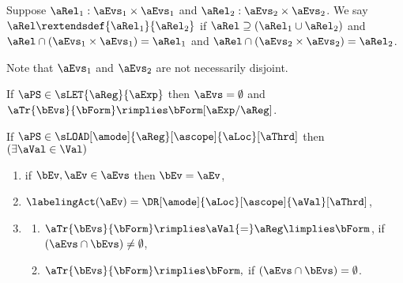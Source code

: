 \begin{definition}
  Suppose $\aRel_1:\aEvs_1\times\aEvs_1$ and $\aRel_2:\aEvs_2\times\aEvs_2$.
  We say $\aRel \rextendsdef{\aRel_1}{\aRel_2}$ if
  $\aRel\supseteq (\aRel_1\cup \aRel_2)$ and
  $\aRel\cap(\aEvs_1\times \aEvs_1) = \aRel_1$ and
  $\aRel\cap(\aEvs_2\times \aEvs_2) = \aRel_2$.
\end{definition}
Note that $\aEvs_1$ and $\aEvs_2$ are not necessarily disjoint.

\begin{definition}
  \noindent
  If $\aPS\in\sLET{\aReg}{\aExp}$ then $\aEvs = \emptyset$ and
  $\aTr{\bEvs}{\bForm} \rimplies \bForm[\aExp/\aReg]$.

  \noindent
  If $\aPS \in \sLOAD[\amode]{\aReg}[\ascope]{\aLoc}[\aThrd]$ then
  $(\exists\aVal\in\Val)$
  \begin{multicols}{2}
    \begin{enumerate}[topsep=0pt,label=(\textsc{r}\arabic*),ref=\textsc{r}\arabic*]
    \item \label{read-E}
      if $\bEv,\aEv\in\aEvs$ then $\bEv=\aEv$,
    \item \label{read-lambda}
      $\labelingAct(\aEv) = \DR[\amode]{\aLoc}[\ascope]{\aVal}[\aThrd]$,
    \item[] \label{read-tau}
      \begin{enumerate}[leftmargin=0pt]
      \item \label{read-tau-nonempty}
        \begin{math}
          \aTr{\bEvs}{\bForm} \rimplies
          \aVal{=}\aReg
          \limplies \bForm
        \end{math},    
        if $(\aEvs\cap\bEvs)\neq\emptyset$,
      \item \label{read-tau-empty}
        \begin{math}
          \aTr{\bEvs}{\bForm} \rimplies
          \bForm,
        \end{math}
        if $(\aEvs\cap\bEvs)=\emptyset$.
      \end{enumerate}
    \end{enumerate}
  \end{multicols}
  \medskip


\end{definition}
